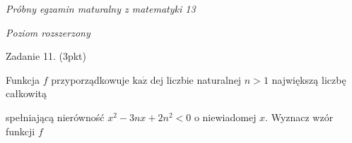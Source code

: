 \documentclass[a4paper,12pt]{article}
\begin{document}
{\it Próbny egzamin maturalny z matematyki 13}

{\it Poziom rozszerzony}

Zadanie 11. (3pkt)

Funkcja $f$ przyporządkowuje $\mathrm{k}\mathrm{a}\dot{\mathrm{z}}$ dej liczbie naturalnej $n>1$ największą liczbę całkowitą

spełniającą nierówność $x^{2}-3nx+2n^{2}<0$ o niewiadomej $x$. Wyznacz wzór funkcji $f$
\end{document}
